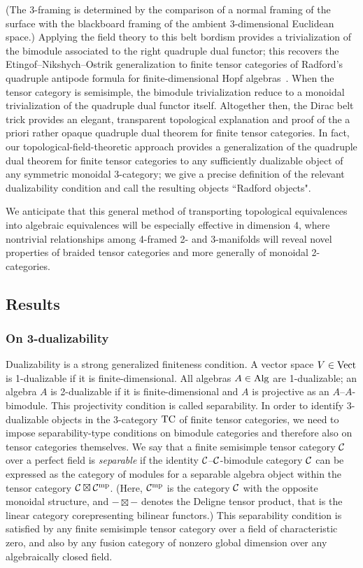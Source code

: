\documentclass{amsart}
\begin{document}
(The 3-framing is determined by the comparison of a normal framing of the surface with the blackboard framing of the ambient 3-dimensional Euclidean space.)  Applying the field theory to this belt bordism provides a trivialization of the bimodule associated to the right quadruple dual functor; this recovers the Etingof--Nikshych--Ostrik generalization to finite tensor categories of Radford's quadruple antipode formula for finite-dimensional Hopf algebras~\cite{MR2097289, MR2183279, MR0407069}.  When the tensor category is semisimple, the bimodule trivialization reduce to a monoidal trivialization of the quadruple dual functor itself.  Altogether then, the Dirac belt trick provides an elegant, transparent topological explanation and proof of the a priori rather opaque quadruple dual theorem for finite tensor categories.  In fact, our topological-field-theoretic approach provides a generalization of the quadruple dual theorem for finite tensor categories to any sufficiently dualizable object of any symmetric monoidal 3-category; we give a precise definition of the relevant dualizability condition and call the resulting objects ``Radford objects".

We anticipate that this general method of transporting topological equivalences into algebraic equivalences will be especially effective in dimension 4, where nontrivial relationships among 4-framed 2- and 3-manifolds will reveal novel properties of braided tensor categories and more generally of monoidal 2-categories.





\subsection{Results}

\subsubsection{On 3-dualizability}

Dualizability is a strong generalized finiteness condition.  A vector space $V \in \mathrm{Vect}$ is 1-dualizable if it is finite-dimensional.  All algebras $A \in \mathrm{Alg}$ are 1-dualizable; an algebra $A$ is 2-dualizable if it is finite-dimensional and $A$ is projective as an $A$--$A$-bimodule.  This projectivity condition is called separability.  In order to identify 3-dualizable objects in the 3-category $\mathrm{TC}$ of finite tensor categories, we need to impose separability-type conditions on bimodule categories and therefore also on tensor categories themselves.  We say that a finite semisimple tensor category $\mathcal C$ over a perfect field is \emph{separable} if the identity $\mathcal C$--$\mathcal C$-bimodule category $\mathcal C$ can be expressed as the category of modules for a separable algebra object within the tensor category $\mathcal C \boxtimes \mathcal C^{\mathrm{mp}}$.  (Here, $\mathcal C^{\mathrm{mp}}$ is the category $\mathcal C$ with the opposite monoidal structure, and $- \boxtimes -$ denotes the Deligne tensor product, that is the linear category corepresenting bilinear functors.)  This separability condition is satisfied by any finite semisimple tensor category over a field of characteristic zero, and also by any fusion category of nonzero global dimension over any algebraically closed field.
\end{document}
